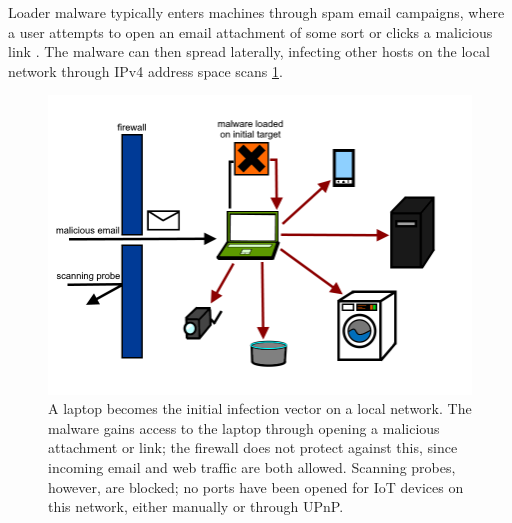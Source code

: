 \documentclass[10pt,sigconf]{acmart}
\begin{document}
Loader malware typically enters machines through spam email campaigns, where a user attempts to open an email attachment of some sort or clicks a malicious link \cite{emotet-malspam} \cite{jasperloader}.
The malware can then spread laterally, infecting other hosts on the local network through IPv4 address space scans \ref{email-vector}.

\begin{figure}
\centering
        \includegraphics[totalheight=8cm]{email.png}
    \caption{A laptop becomes the initial infection vector on a local network. The malware gains access to the laptop through opening a malicious attachment or link; the firewall does not protect against this, since incoming email and web traffic are both allowed. Scanning probes, however, are blocked; no ports have been opened for IoT devices on this network, either manually or through UPnP.}
    \label{email-vector}
\end{figure}
\end{document}
